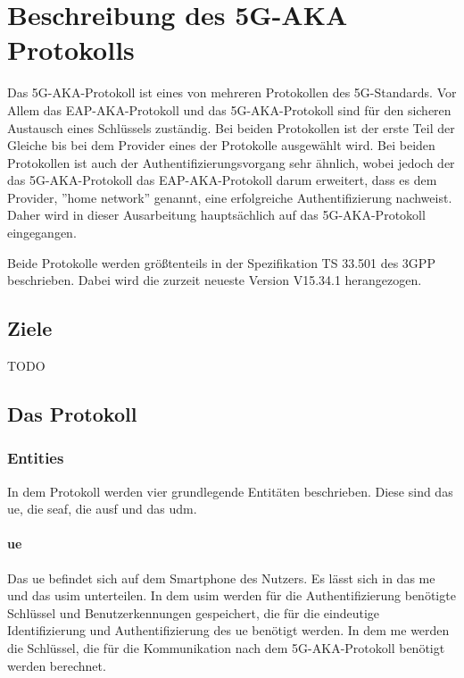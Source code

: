\chapter{Beschreibung des 5G-AKA Protokolls}
\label{chap:2}

Das 5G-AKA-Protokoll ist eines von mehreren Protokollen des 5G-Standards.
Vor Allem das EAP-AKA-Protokoll und das 5G-AKA-Protokoll sind f\"ur den sicheren Austausch eines Schl\"ussels zust\"andig. 
Bei beiden Protokollen ist der erste Teil der Gleiche bis bei dem Provider eines der Protokolle ausgew\"ahlt wird. %
Bei beiden Protokollen ist auch der Authentifizierungsvorgang sehr \"ahnlich, wobei jedoch der das 5G-AKA-Protokoll das EAP-AKA-Protokoll darum erweitert, dass es dem Provider, ''home network'' genannt, eine erfolgreiche Authentifizierung nachweist. %
Daher wird in dieser Ausarbeitung haupts\"achlich auf das 5G-AKA-Protokoll eingegangen.

Beide Protokolle werden gr\"o{\ss}tenteils in der Spezifikation TS 33.501 des 3GPP beschrieben. %
Dabei wird die zurzeit neueste Version V15.34.1 herangezogen.

\section{Ziele}

TODO

\section{Das Protokoll}

\subsection{Entities}

In dem Protokoll werden vier grundlegende Entit\"aten beschrieben.
Diese sind das \gls{ue}, die \gls{seaf}, die \gls{ausf} und das \gls{udm}.

\subsubsection{\gls{ue}}

Das \gls{ue} befindet sich auf dem Smartphone des Nutzers.
Es l\"asst sich in das \gls{me} und das \gls{usim} unterteilen.
In dem \gls{usim} werden f\"ur die Authentifizierung ben\"otigte Schl\"ussel und Benutzerkennungen gespeichert, die f\"ur die eindeutige Identifizierung und Authentifizierung des \gls{ue} ben\"otigt werden. %
In dem \gls{me} werden die Schl\"ussel, die f\"ur die Kommunikation nach dem 5G-AKA-Protokoll ben\"otigt werden berechnet.

